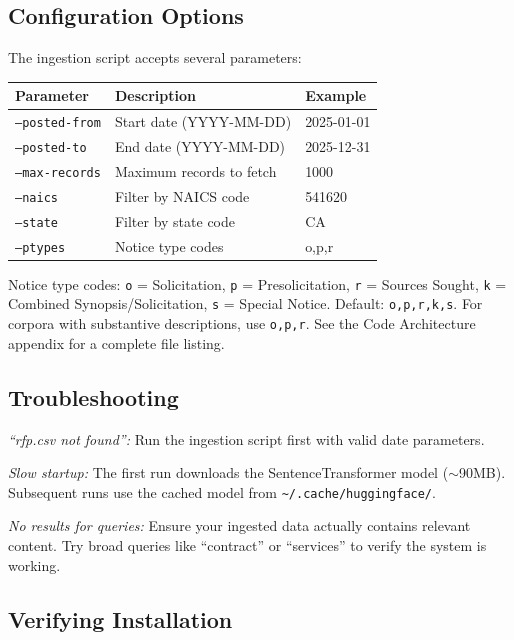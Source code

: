 \documentclass[10pt,twocolumn]{article}
\begin{document}
\subsection{Configuration Options}

The ingestion script accepts several parameters:

\begin{table}[h]
\begin{tabular}{lll}
\toprule
Parameter & Description & Example \\
\midrule
\texttt{--posted-from} & Start date (YYYY-MM-DD) & 2025-01-01 \\
\texttt{--posted-to} & End date (YYYY-MM-DD) & 2025-12-31 \\
\texttt{--max-records} & Maximum records to fetch & 1000 \\
\texttt{--naics} & Filter by NAICS code & 541620 \\
\texttt{--state} & Filter by state code & CA \\
\texttt{--ptypes} & Notice type codes & o,p,r \\
\bottomrule
\end{tabular}
\end{table}

Notice type codes: \texttt{o} = Solicitation, \texttt{p} = Presolicitation, \texttt{r} = Sources Sought, \texttt{k} = Combined Synopsis/Solicitation, \texttt{s} = Special Notice. Default: \texttt{o,p,r,k,s}. For corpora with substantive descriptions, use \texttt{o,p,r}. See the Code Architecture appendix for a complete file listing.

\subsection{Troubleshooting}

\textit{``rfp.csv not found'':} Run the ingestion script first with valid date parameters.

\textit{Slow startup:} The first run downloads the SentenceTransformer model ($\sim$90MB). Subsequent runs use the cached model from \texttt{\textasciitilde/.cache/huggingface/}.

\textit{No results for queries:} Ensure your ingested data actually contains relevant content. Try broad queries like ``contract'' or ``services'' to verify the system is working.

\subsection{Verifying Installation}
\end{document}
